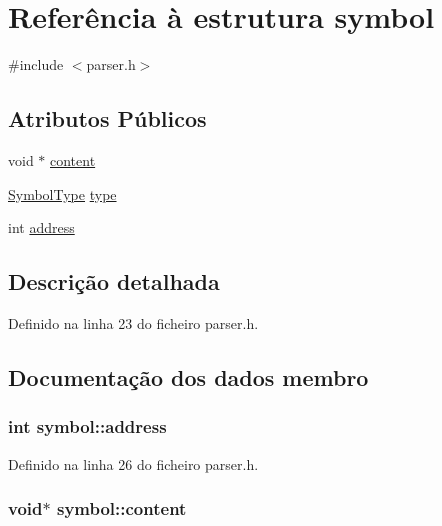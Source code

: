 \hypertarget{structsymbol}{\section{Referência à estrutura symbol}
\label{structsymbol}
}


{\ttfamily \#include $<$parser.\-h$>$}

\subsection*{Atributos Públicos}
\begin{DoxyCompactItemize}
\item 
void $\ast$ \hyperlink{structsymbol_ab02c30f9f1e8f2d8ff1501888006abde}{content}
\item 
\hyperlink{parser_8h_add8909e1085c0c32f8380ff493a243b3}{Symbol\-Type} \hyperlink{structsymbol_adba0eaeb4bfbf4787bd3899e4202cc90}{type}
\item 
int \hyperlink{structsymbol_aa61e9dd64d1465422a2b39ca16dc3aca}{address}
\end{DoxyCompactItemize}


\subsection{Descrição detalhada}


Definido na linha 23 do ficheiro parser.\-h.



\subsection{Documentação dos dados membro}
\hypertarget{structsymbol_aa61e9dd64d1465422a2b39ca16dc3aca}{
\subsubsection[{address}]{\setlength{\rightskip}{0pt plus 5cm}int symbol\-::address}}\label{structsymbol_aa61e9dd64d1465422a2b39ca16dc3aca}


Definido na linha 26 do ficheiro parser.\-h.

\hypertarget{structsymbol_ab02c30f9f1e8f2d8ff1501888006abde}{
\subsubsection[{content}]{\setlength{\rightskip}{0pt plus 5cm}void$\ast$ symbol\-::content}}\label{structsymbol_ab02c30f9f1e8f2d8ff1501888006abde}



